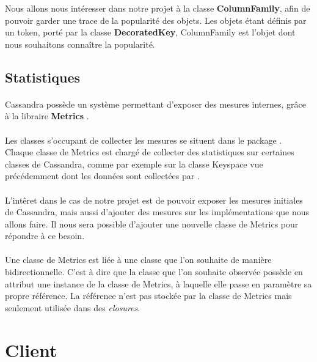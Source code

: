 \documentclass[12pt]{article}
\begin{document}
Nous allons nous intéresser dans notre projet à la classe \textbf{ColumnFamily}, afin de pouvoir garder une trace de la popularité des objets. Les objets étant définis par un token, porté par la classe \textbf{DecoratedKey}, ColumnFamily est l'objet dont nous souhaitons connaître la popularité.

\subsection{Statistiques}

\paragraph{} Cassandra possède un système permettant d'exposer des mesures internes, grâce à la libraire \textbf{Metrics} \cite{Metrics2010}.

\paragraph{} Les classes s'occupant de collecter les mesures se situent dans le package . Chaque classe de Metrics est chargé de collecter des statistiques sur certaines classes de Cassandra, comme par exemple sur la classe Keyspace vue précédemment dont les données sont collectées par .

\paragraph{} L'intêret dans le cas de notre projet est de pouvoir exposer les mesures initiales de Cassandra, mais aussi d'ajouter des mesures sur les implémentations que nous allons faire. Il nous sera possible d'ajouter une nouvelle classe de Metrics pour répondre à ce besoin.

\paragraph{} Une classe de Metrics est liée à une classe que l'on souhaite de manière bidirectionnelle. C'est à dire que la classe que l'on souhaite observée possède en attribut une instance de la classe de Metrics, à laquelle elle passe en paramètre sa propre référence. La référence n'est pas stockée par la classe de Metrics mais seulement utilisée dans des \textit{closures}.


\newpage

\section{Client}
\end{document}
